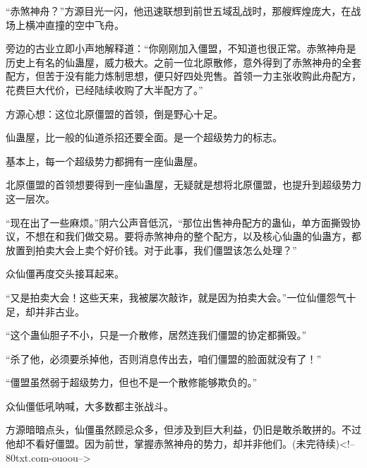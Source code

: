 \begin{this_body}
“赤煞神舟？”方源目光一闪，他迅速联想到前世五域乱战时，那艘辉煌庞大，在战场上横冲直撞的空中飞舟。

旁边的古业立即小声地解释道：“你刚刚加入僵盟，不知道也很正常。赤煞神舟是历史上有名的仙蛊屋，威力极大。之前一位北原散修，意外得到了赤煞神舟的全套配方，但苦于没有能力炼制思想，便只好四处兜售。首领一力主张收购此舟配方，花费巨大代价，已经陆续收购了大半配方了。”

方源心想：这位北原僵盟的首领，倒是野心十足。

仙蛊屋，比一般的仙道杀招还要全面。是一个超级势力的标志。

基本上，每一个超级势力都拥有一座仙蛊屋。

北原僵盟的首领想要得到一座仙蛊屋，无疑就是想将北原僵盟，也提升到超级势力这一层次。

“现在出了一些麻烦。”阴六公声音低沉，“那位出售神舟配方的蛊仙，单方面撕毁协议，不想在和我们做交易。要将赤煞神舟的整个配方，以及核心仙蛊的仙蛊方，都放置到拍卖大会上卖个好价钱。对于此事，我们僵盟该怎么处理？”

众仙僵再度交头接耳起来。

“又是拍卖大会！这些天来，我被屡次敲诈，就是因为拍卖大会。”一位仙僵怨气十足，却并非古业。

“这个蛊仙胆子不小，只是一介散修，居然连我们僵盟的协定都撕毁。”

“杀了他，必须要杀掉他，否则消息传出去，咱们僵盟的脸面就没有了！”

“僵盟虽然弱于超级势力，但也不是一个散修能够欺负的。”

众仙僵低吼呐喊，大多数都主张战斗。

方源暗暗点头，仙僵虽然顾忌众多，但涉及到巨大利益，仍旧是敢杀敢拼的。不过他却不看好僵盟。因为前世，掌握赤煞神舟的势力，却并非他们。(未完待续)<!--80txt.com-ouoou-->

\end{this_body}

